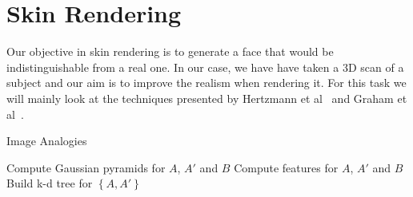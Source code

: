 \documentclass[11pt]{report}
\begin{document}





\section{Skin Rendering}

Our objective in skin rendering is to generate a face that would be indistinguishable from a real one.
In our case, we have have taken a 3D scan of a subject and our aim is to improve the realism when rendering it.
For this task we will mainly look at the techniques presented by Hertzmann et al~\cite{Hertzmann2001} and Graham et al~\cite{Graham2013}.

\begin{algorithm}[htbp!] 
	\caption{Image Analogies}
	\label{alg:image_analogies}
	
	Compute Gaussian pyramids for $A$, $A'$ and $B$\;
	Compute features for $A$, $A'$ and $B$\;
	Build k-d tree for $\left\lbrace A, A' \right\rbrace$\;

\end{algorithm}
\end{document}
